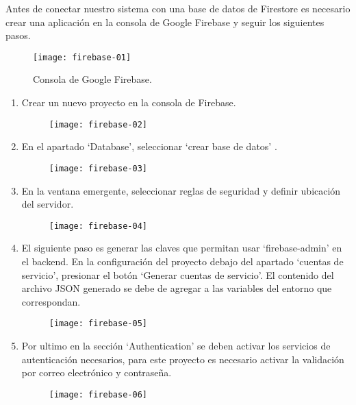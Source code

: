 Antes de conectar nuestro sistema con una base de datos de Firestore es necesario crear una aplicación en la consola de Google Firebase y seguir los siguientes pasos.
\vspace{0.8cm}

\begin{figure}[H]
  \centering
  \texttt{[image: firebase-01]}
  \caption{Consola de Google Firebase.}
\end{figure}

\begin{enumerate}
  \item Crear un nuevo proyecto en la consola de Firebase.

  \begin{figure}[H]
    \centering
    \texttt{[image: firebase-02]}
  \end{figure}

  \item En el apartado `Database', seleccionar `crear base de datos' .

  \begin{figure}[H]
    \centering
    \texttt{[image: firebase-03]}
  \end{figure}

  \item En la ventana emergente, seleccionar reglas de seguridad y definir ubicación del servidor.

  \begin{figure}[H]
    \centering
    \texttt{[image: firebase-04]}
  \end{figure}

  \item El siguiente paso es generar las claves que permitan usar `firebase-admin' en el backend. En la configuración del proyecto debajo del apartado `cuentas de servicio', presionar el botón `Generar cuentas de servicio'. El contenido del archivo JSON generado se debe de agregar a las variables del entorno que correspondan.

  \begin{figure}[H]
    \centering
    \texttt{[image: firebase-05]}
  \end{figure}

  \item Por ultimo en la sección `Authentication' se deben activar los servicios de autenticación necesarios, para este proyecto es necesario activar la validación por correo electrónico y contraseña.

  \begin{figure}[H]
    \centering
    \texttt{[image: firebase-06]}
  \end{figure}
\end{enumerate}

